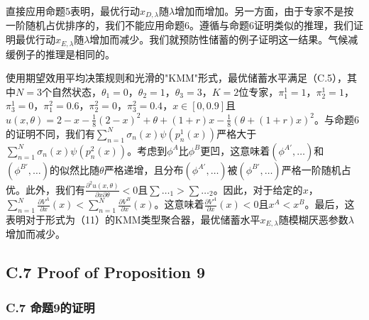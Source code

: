 \documentclass[12pt,a4paper]{article}
\newenvironment{translation}
  {\par\noindent{\color{transblue}\ignorespaces}}
  {\par\medskip}
\begin{document}
\begin{translation}
直接应用命题5表明，最优行动$x_{D,\lambda}$随$\lambda$增加而增加。另一方面，由于专家不是按一阶随机占优排序的，我们不能应用命题6。遵循与命题6证明类似的推理，我们证明最优行动$x_{E,\lambda}$随$\lambda$增加而减少。我们就预防性储蓄的例子证明这一结果。气候减缓例子的推理是相同的。

使用期望效用平均决策规则和光滑的"KMM"形式，最优储蓄水平满足（C.5），其中$N = 3$个自然状态，$\theta_{1} = 0$，$\theta_{2} = 1$，$\theta_{3} = 3$，$K = 2$位专家，$\pi^{1}_{1} = 1$，$\pi^{1}_{2} = 1$，$\pi^{1}_{3} = 0$，$\pi^{2}_{1} = 0.6$，$\pi^{2}_{2} = 0$，$\pi^{2}_{3} = 0.4$，$x \in [0, 0.9]$且$u(x, \theta) = 2 - x - \frac{1}{8}(2 - x)^{2} + \theta + (1 + r)x - \frac{1}{8}(\theta + (1 + r)x)^{2}$。与命题6的证明不同，我们有$\sum_{n=1}^{N} \sigma_{n}(x) \psi(p^{1}_{n}(x))$严格大于$\sum_{n=1}^{N} \sigma_{n}(x) \psi(p^{2}_{n}(x))$。考虑到$\phi^{A}$比$\phi^{B}$更凹，这意味着$(\phi^{A\prime}, \dots)$和$(\phi^{B\prime}, \dots)$的似然比随$\theta$严格递增，且分布$(\phi^{A\prime}, \dots)$被$(\phi^{B\prime}, \dots)$严格一阶随机占优。此外，我们有$\frac{\partial^{2} u(x,\theta)}{\partial x \partial \theta} < 0$且$\sum \dots_{1} > \sum \dots_{2}$。因此，对于给定的$x$，$\sum_{n=1}^{N} \frac{\partial V^{A}}{\partial x}(x) < \sum_{n=1}^{N} \frac{\partial V^{B}}{\partial x}(x)$。这意味着$\frac{\partial V^{A}}{\partial x}(x) < 0$且$x^{A} < x^{B}$。最后，这表明对于形式为（11）的KMM类型聚合器，最优储蓄水平$x_{E,\lambda}$随模糊厌恶参数$\lambda$增加而减少。
\end{translation}

\subsection*{C.7 Proof of Proposition 9}
{\color{transblue}\subsubsection*{C.7 命题9的证明}}
\end{document}
